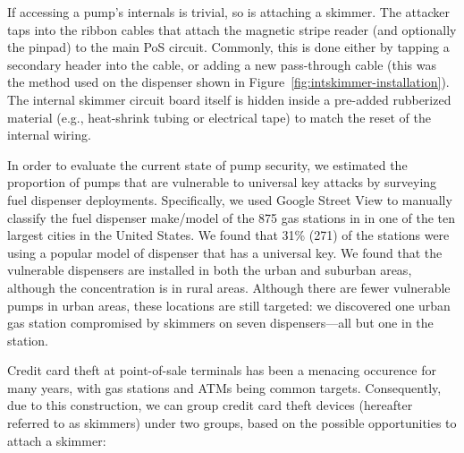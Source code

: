 
If accessing a pump's internals is trivial, so is attaching a skimmer.
%
The attacker taps into the ribbon cables that attach the magnetic stripe reader
(and optionally the pinpad) to the main PoS circuit.
%
Commonly, this is done either by tapping a secondary header into the cable, or
adding a new pass-through cable (this was the method used on the dispenser shown
in Figure~\ref{fig:intskimmer-installation}).
%
The internal skimmer circuit board itself is hidden inside a pre-added
rubberized material (e.g., heat-shrink tubing or electrical tape) to match the
reset of the internal wiring.

In order to evaluate the current state of pump security, we estimated the
proportion of pumps that are vulnerable to universal key attacks by surveying
fuel dispenser deployments. 
%
Specifically, we used Google Street View to manually classify the fuel dispenser
make/model of the 875 gas stations in in one of the ten largest cities in the
United States.
%
We found that 31\% (271) of the stations were using a popular model of
dispenser that has a universal key.
% 
We found that the vulnerable dispensers are installed in both the urban and
suburban areas, although the concentration is in rural areas. 
%
Although there are fewer vulnerable pumps in urban areas, these locations are
still targeted: we discovered one urban gas station compromised by skimmers on
seven dispensers---all but one in the station.



Credit card theft at point-of-sale terminals has been a menacing occurence for
many years, with gas stations and ATMs being common targets. Consequently, due
to this construction, we can group credit card theft devices (hereafter
referred to as skimmers) under two groups, based on the possible opportunities
to attach a skimmer: 

